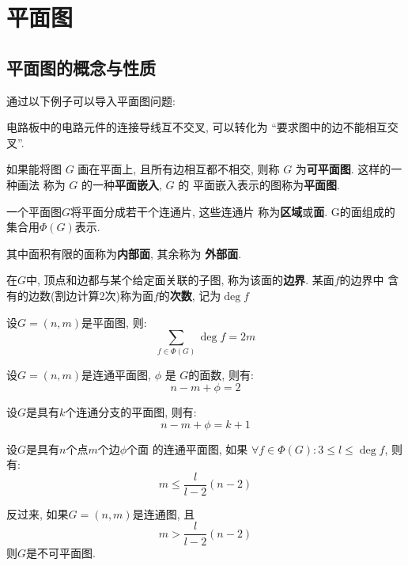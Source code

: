 \section{平面图}

\subsection{平面图的概念与性质}

通过以下例子可以导入平面图问题:

\begin{example}[电路板设计问题]
    电路板中的电路元件的连接导线互不交叉, 可以转化为
    ``要求图中的边不能相互交叉''.
\end{example}

\begin{definition}[平面图]
    如果能将图 \(G\) 画在平面上, 且所有边相互都不相交,
    则称 \(G\) 为\textbf{可平面图}. 这样的一种画法
    称为 \(G\) 的一种\textbf{平面嵌入}, \(G\) 的
    平面嵌入表示的图称为\textbf{平面图}.
\end{definition}

\begin{definition}[平面图的面]
    一个平面图\(G\)将平面分成若干个连通片, 这些连通片
    称为\textbf{区域}或\textbf{面}. 
    G的面组成的集合用\(\varPhi(G)\)表示.

    其中面积有限的面称为\textbf{内部面}, 其余称为
    \textbf{外部面}.

    在\(G\)中, 顶点和边都与某个给定面关联的子图,
    称为该面的\textbf{边界}. 某面\(f\)的边界中
    含有的边数(割边计算2次)称为面\(f\)的\textbf{次数},
    记为\(\deg f\)
\end{definition}

\begin{theorem}[仿握手定理]
    设\(G = (n,m)\)是平面图, 则:
    \[\sum_{f \in \varPhi(G)} \deg f = 2m\]
\end{theorem}

\begin{theorem}[平面图的Euler公式]
    设\(G = (n,m)\)是连通平面图, \(\phi\) 是
    \(G\)的面数, 则有:
    \[n - m + \phi = 2\]
\end{theorem}

\begin{deduction}
    设\(G\)是具有\(k\)个连通分支的平面图, 则有:
    \[n - m + \phi = k + 1\]
\end{deduction}

\begin{deduction}
    设\(G\)是具有\(n\)个点\(m\)个边\(\phi\)个面
    的连通平面图, 如果
    \(\forall f \in \varPhi(G):3 \le l \le \deg f\),
    则有:
    \[m \le \frac{l}{l-2}(n-2)\]

    反过来, 如果\(G=(n,m)\)是连通图, 且
    \[m > \frac{l}{l-2}(n-2)\]
    则\(G\)是不可平面图.
\end{deduction}

